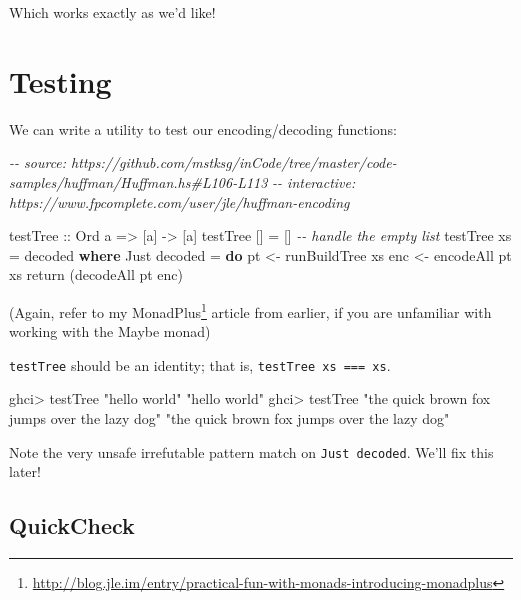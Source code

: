 \documentclass[]{article}
\newenvironment{Shaded}{}{}
\newcommand{\CommentTok}[1]{\textcolor[rgb]{0.38,0.63,0.69}{\textit{#1}}}
\newcommand{\DataTypeTok}[1]{\textcolor[rgb]{0.56,0.13,0.00}{#1}}
\newcommand{\FunctionTok}[1]{\textcolor[rgb]{0.02,0.16,0.49}{#1}}
\newcommand{\KeywordTok}[1]{\textcolor[rgb]{0.00,0.44,0.13}{\textbf{#1}}}
\newcommand{\NormalTok}[1]{#1}
\newcommand{\OperatorTok}[1]{\textcolor[rgb]{0.40,0.40,0.40}{#1}}
\newcommand{\OtherTok}[1]{\textcolor[rgb]{0.00,0.44,0.13}{#1}}
\newcommand{\StringTok}[1]{\textcolor[rgb]{0.25,0.44,0.63}{#1}}
\renewcommand{\href}[2]{#2\footnote{\url{#1}}}
\begin{document}
Which works exactly as we'd like!

\hypertarget{testing}{%
\section{Testing}\label{testing}}

We can write a utility to test our encoding/decoding functions:

\begin{Shaded}
\begin{Highlighting}[]
\CommentTok{{-}{-} source: https://github.com/mstksg/inCode/tree/master/code{-}samples/huffman/Huffman.hs\#L106{-}L113}
\CommentTok{{-}{-} interactive: https://www.fpcomplete.com/user/jle/huffman{-}encoding}

\OtherTok{testTree ::} \DataTypeTok{Ord}\NormalTok{ a }\OtherTok{=>}\NormalTok{ [a] }\OtherTok{{-}>}\NormalTok{ [a]}
\NormalTok{testTree [] }\OtherTok{=}\NormalTok{ []                    }\CommentTok{{-}{-} handle the empty list}
\NormalTok{testTree xs }\OtherTok{=}\NormalTok{ decoded}
  \KeywordTok{where}
    \DataTypeTok{Just}\NormalTok{ decoded }\OtherTok{=} \KeywordTok{do}
\NormalTok{      pt  }\OtherTok{<{-}}\NormalTok{ runBuildTree xs}
\NormalTok{      enc }\OtherTok{<{-}}\NormalTok{ encodeAll pt xs}
      \FunctionTok{return}\NormalTok{ (decodeAll pt enc)}
\end{Highlighting}
\end{Shaded}

(Again, refer to my
\href{http://blog.jle.im/entry/practical-fun-with-monads-introducing-monadplus}{MonadPlus}
article from earlier, if you are unfamiliar with working with the Maybe monad)

\texttt{testTree} should be an identity; that is,
\texttt{testTree\ xs\ ===\ xs}.

\begin{Shaded}
\begin{Highlighting}[]
\NormalTok{ghci}\OperatorTok{>}\NormalTok{ testTree }\StringTok{"hello world"}
\StringTok{"hello world"}
\NormalTok{ghci}\OperatorTok{>}\NormalTok{ testTree }\StringTok{"the quick brown fox jumps over the lazy dog"}
\StringTok{"the quick brown fox jumps over the lazy dog"}
\end{Highlighting}
\end{Shaded}

Note the very unsafe irrefutable pattern match on \texttt{Just\ decoded}. We'll
fix this later!

\hypertarget{quickcheck}{%
\subsection{QuickCheck}\label{quickcheck}}
\end{document}
